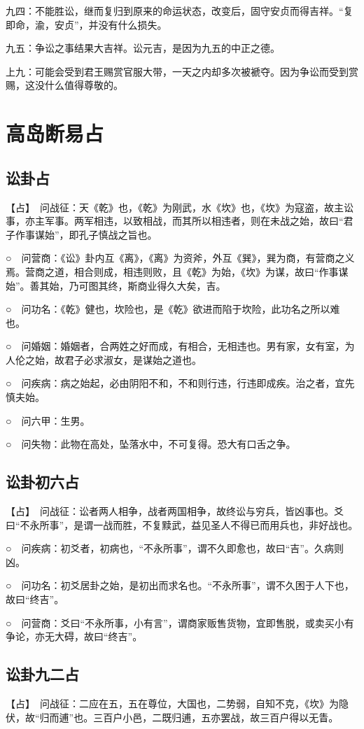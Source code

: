 \documentclass[12pt,oneside]{book}
\begin{document}
九四：不能胜讼，继而复归到原来的命运状态，改变后，固守安贞而得吉祥。“复即命，渝，安贞”，并没有什么损失。

九五：争讼之事结果大吉祥。讼元吉，是因为九五的中正之德。

上九：可能会受到君王赐赏官服大带，一天之内却多次被褫夺。因为争讼而受到赏赐，这没什么值得尊敬的。


\section{高岛断易占}
\subsection{讼卦占}
【占】　问战征：天《乾》也，《乾》为刚武，水《坎》也，《坎》为寇盗，故主讼事，亦主军事。两军相违，以致相战，而其所以相违者，则在未战之始，故曰“君子作事谋始”，即孔子慎战之旨也。

○　问营商：《讼》卦内互《离》，《离》为资斧，外互《巽》，巽为商，有营商之义焉。营商之道，相合则成，相违则败，且《乾》为始，《坎》为谋，故曰“作事谋始”。善其始，乃可图其终，斯商业得久大矣，吉。

○　问功名：《乾》健也，坎险也，是《乾》欲进而陷于坎险，此功名之所以难也。

○　问婚姻：婚姻者，合两姓之好而成，有相合，无相违也。男有家，女有室，为人伦之始，故君子必求淑女，是谋始之道也。

○　问疾病：病之始起，必由阴阳不和，不和则行违，行违即成疾。治之者，宜先慎夫始。

○　问六甲：生男。

○　问失物：此物在高处，坠落水中，不可复得。恐大有口舌之争。

\subsection{讼卦初六占}
【占】　问战征：讼者两人相争，战者两国相争，故终讼与穷兵，皆凶事也。爻曰“不永所事”，是谓一战而胜，不复黩武，益见圣人不得已而用兵也，非好战也。

○　问疾病：初爻者，初病也，“不永所事”，谓不久即愈也，故曰“吉”。久病则凶。

○　问功名：初爻居卦之始，是初出而求名也。“不永所事”，谓不久困于人下也，故曰“终吉”。

○　问营商：爻曰“不永所事，小有言”，谓商家贩售货物，宜即售脱，或卖买小有争论，亦无大碍，故曰“终吉”。


\subsection{讼卦九二占}
【占】　问战征：二应在五，五在尊位，大国也，二势弱，自知不克，《坎》为隐伏，故“归而逋”也。三百户小邑，二既归逋，五亦罢战，故三百户得以无眚。
\end{document}
